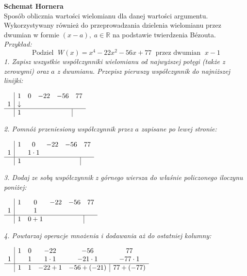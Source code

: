 \documentclass[14pt,a4paper]{extarticle}
\begin{document}
\noindent\textbf{Schemat Hornera}\\
Sposób oblicznia wartości wielomianu dla danej wartości argumentu. Wykorzystywany również do przeprowadzania
dzielenia wielomianu przez dwumian w formie $(x - a),\;a \in \mathbb{R}$ na podstawie twierdzenia B\'ezouta.\hfill\break\\
\textit{Przykład:}
$$\text{Podziel } \;W(x) = x^{4}-22x^{2}-56x+77\; \text{ przez dwumian }\; x - 1$$
\textit{1. Zapisz wszystkie współczynniki wielomianu od najwyższej potęgi (także z zerowymi)
oraz $a$ z dwumianu. Przepisz pierwszy współczynnik do najniższej linijki:}\\
\begin{center}
$\begin{array}{c|ccccc}
    & 1 & 0 & -22 & -56 & 77\\
  1 & \downarrow   &   &     &     &   \\ \hline
    & 1  &   &     &\multicolumn{1}{c|}{}   &
\end{array}$\end{center}

\noindent\textit{2. Pomnóż przeniesiony współczynnik przez $a$ zapisane po lewej stronie:}\\
\begin{center}
$\begin{array}{c|ccccc}
   & 1 & 0 & -22 & -56 & 77\\
 1 &   & 1 \cdot 1  &     &     &   \\ \hline
   & 1  &   &     &\multicolumn{1}{c|}{}   &
\end{array}$\end{center}

\noindent\textit{3. Dodaj ze sobą współczynnik z górnego wiersza do właśnie policzonego iloczynu poniżej:}\\
\begin{center}
   $\begin{array}{c|ccccc}
      & 1 & 0 & -22 & -56 & 77\\
    1 &   & 1 &     &     &   \\ \hline
      & 1 & 0 + 1  &     &\multicolumn{1}{c|}{}   &
   \end{array}$\end{center}

\noindent\textit{4. Powtarzaj operacje mnożenia i dodawania aż do ostatniej kolumny:}\\
\begin{center}
   $\begin{array}{c|ccccc}
      & 1 & 0 & -22 & -56 & 77\\
    1 &   & 1 &  1\cdot 1   & -21 \cdot 1 & -77\cdot 1  \\ \hline
      & 1 & 1 &  -22 + 1   &\multicolumn{1}{c|}{-56 + (-21) }  & 77 + (-77)
   \end{array}$
\end{center}
\end{document}
